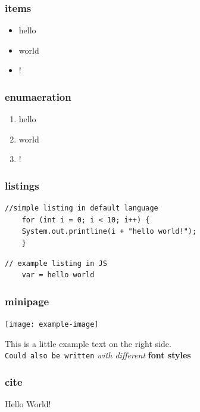\subsubsection{items}
\begin{itemize}
    \item hello
    \item world
    \item !
\end{itemize}

\subsubsection{enumaeration}
\begin{enumerate}
    \item hello
    \item world
    \item !
\end{enumerate}

\subsubsection{listings}
\begin{lstlisting}[caption=example listing]
//simple listing in default language
    for (int i = 0; i < 10; i++) {
    System.out.printline(i + "hello world!");
    }
\end{lstlisting}

\begin{lstlisting}[firstnumber=17, caption=example listing, style=JavaScript]
// example listing in JS
    var = hello world
\end{lstlisting}


\subsubsection{minipage}
\begin{minipage}{0.5\linewidth}
    \begin{center}
        \texttt{[image: example-image]}
        \vspace{-8pt}
    \end{center}
\end{minipage}
\begin{minipage}{0.45\linewidth}
    This is a little example text on the right side.\\
    \texttt{Could also be written} \textit{with different} \textbf{font styles}
\end{minipage}

\subsubsection{cite}
Hello World!\cite{latex2e}